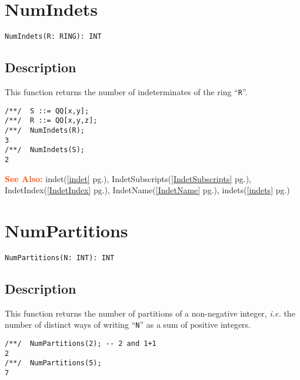 \documentclass[a4paper]{mybook}
\newenvironment{command}{}{} %
\newcommand\SeeAlso{\par\textcolor{OrangeRed}{\textbf{\large See Also: }}}
\begin{document}
\section{NumIndets}
\label{NumIndets}
\begin{command} %


\begin{Verbatim}[label=syntax, rulecolor=\color{MidnightBlue},
frame=single]
NumIndets(R: RING): INT
\end{Verbatim}


\subsection*{Description}

This function returns the number of indeterminates of the ring ``\verb&R&''.
\begin{Verbatim}[label=example, rulecolor=\color{PineGreen}, frame=single]
/**/  S ::= QQ[x,y];
/**/  R ::= QQ[x,y,z];
/**/  NumIndets(R);
3
/**/  NumIndets(S);
2
\end{Verbatim}


\SeeAlso %
  indet(\ref{indet} pg.\pageref{indet}), 
    IndetSubscripts(\ref{IndetSubscripts} pg.\pageref{IndetSubscripts}), 
    IndetIndex(\ref{IndetIndex} pg.\pageref{IndetIndex}), 
    IndetName(\ref{IndetName} pg.\pageref{IndetName}), 
    indets(\ref{indets} pg.\pageref{indets})
\end{command} %

\section{NumPartitions}
\label{NumPartitions}
\begin{command} %


\begin{Verbatim}[label=syntax, rulecolor=\color{MidnightBlue},
frame=single]
NumPartitions(N: INT): INT
\end{Verbatim}


\subsection*{Description}

This function returns the number of partitions of a non-negative integer,
\textit{i.e.} the number of distinct ways of writing ``\verb&N&'' as a sum of positive integers.
\begin{Verbatim}[label=example, rulecolor=\color{PineGreen}, frame=single]
/**/  NumPartitions(2); -- 2 and 1+1
2
/**/  NumPartitions(5);
7
\end{Verbatim}


\end{command} %
\end{document}
